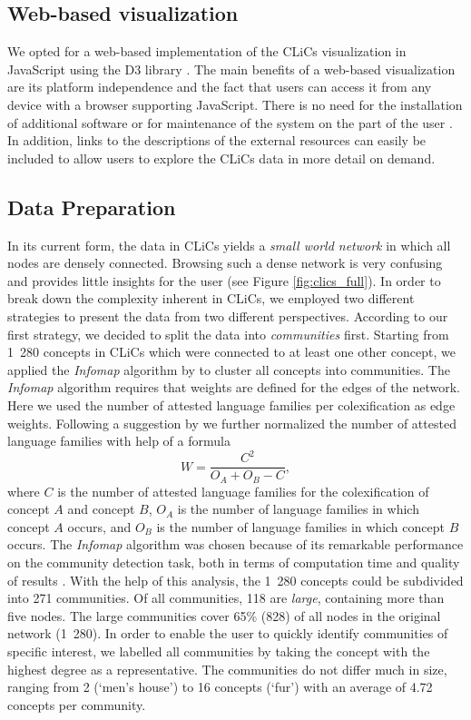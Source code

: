 \subsection{Web-based visualization}

We opted for a web-based implementation of the CLiCs visualization in JavaScript using the D3 library \cite{D3}. The main benefits of a web-based visualization are its platform independence and the fact that users can access it from any device with a browser supporting JavaScript. There is no need for the installation of additional software or for maintenance of the system on the part of the user \cite{Murray}. In addition, links to the descriptions of the external resources can easily be included to allow users to explore the CLiCs data in more detail on demand. 

\subsection{Data Preparation}
In its current form, the data in CLiCs yields a \emph{small world network} in which all nodes are
densely connected. Browsing such a dense network is very confusing and provides little insights for
the user (see Figure \ref{fig:clics_full}). In order to break down the complexity inherent in CLiCs,
we employed two different strategies to present the data from two different perspectives. 
According to our first strategy, we decided to split the data
into \emph{communities} first. 
Starting from 1~280 concepts in CLiCs which
were connected to at least one other concept, we applied the \emph{Infomap} algorithm by
 to cluster all concepts into communities.
The \emph{Infomap} algorithm requires that weights are defined for the edges of the network.
Here we used the number of attested language families per colexification as edge weights. Following
a suggestion by  we
further normalized the number of attested language families with help of a formula
\begin{equation}
    W = \frac{C^2}{O_A+O_B - C},
\end{equation}
where $C$ is the number of attested language families for the colexification of concept $A$ and
concept $B$, $O_A$ is the number of language families in which concept $A$ occurs, and $O_B$ is the
number of language families in which concept $B$ occurs. 
The \emph{Infomap} algorithm was chosen because of
its remarkable performance on the community detection task, both in terms of computation time and
quality of results \cite{Lancichinetti2009}.
With the help of this analysis, the 1~280 concepts
could be subdivided into 271 communities. 
Of all communities, 118 are \emph{large}, containing more than
five nodes. The large communities cover 65\% (828) of all nodes in the original network (1~280). In
order to enable the user to quickly identify communities of specific interest, we labelled all
communities by taking the concept with the highest degree as a representative. 
The communities do not differ much in size, ranging from 2 (`men's house') to 16 concepts (`{fur}')
with an average of 4.72 concepts per community.
 
